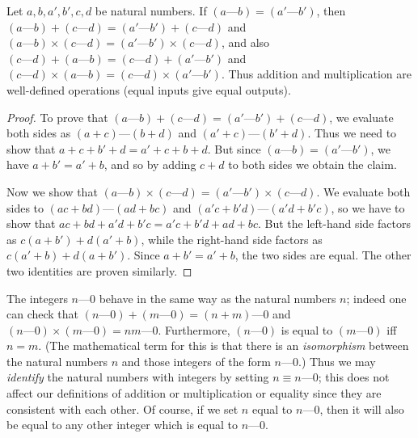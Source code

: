 \begin{lem}\label{4.1.3}
  Let \(a, b, a', b', c, d\) be natural numbers.
  If \((a \text{---} b) = (a' \text{---} b')\), then \((a \text{---} b) + (c \text{---} d) = (a' \text{---} b') + (c \text{---} d)\) and \((a \text{---} b) \times (c \text{---} d) = (a' \text{---} b') \times (c \text{---} d)\), and also \((c \text{---} d) + (a \text{---} b) = (c \text{---} d) + (a' \text{---} b')\) and \((c \text{---} d) \times (a \text{---} b) = (c \text{---} d) \times (a' \text{---} b')\).
  Thus addition and multiplication are well-defined operations (equal inputs give equal outputs).
\end{lem}

\begin{proof}
  To prove that \((a \text{---} b) + (c \text{---} d) = (a' \text{---} b') + (c \text{---} d)\), we evaluate both sides as \((a + c) \text{---} (b + d)\) and \((a' + c) \text{---} (b' + d)\).
  Thus we need to show that \(a + c + b' + d = a' + c + b + d\).
  But since \((a \text{---} b) = (a' \text{---} b')\), we have \(a + b' = a' + b\), and so by adding \(c + d\) to both sides we obtain the claim.

  Now we show that \((a \text{---} b) \times (c \text{---} d) = (a' \text{---} b') \times (c \text{---} d)\).
  We evaluate both sides to \((ac + bd) \text{---} (ad + bc)\) and \((a'c + b'd) \text{---} (a'd + b'c)\), so we have to show that \(ac + bd + a'd + b'c = a'c + b'd + ad + bc\).
  But the left-hand side factors as \(c(a + b') + d(a' + b)\), while the right-hand side factors as \(c(a' + b) + d(a + b')\).
  Since \(a + b' = a' + b\), the two sides are equal.
  The other two identities are proven similarly.
\end{proof}

\begin{note}
  The integers \(n \text{---} 0\) behave in the same way as the natural numbers \(n\);
  indeed one can check that \((n \text{---} 0) + (m \text{---} 0) = (n + m) \text{---} 0\) and \((n \text{---} 0) \times (m \text{---} 0) = nm \text{---} 0\).
  Furthermore, \((n \text{---} 0)\) is equal to \((m \text{---} 0)\) iff \(n = m\).
  (The mathematical term for this is that there is an \emph{isomorphism} between the natural numbers \(n\) and those integers of the form \(n \text{---} 0\).)
  Thus we may \emph{identify} the natural numbers with integers by setting \(n \equiv n \text{---} 0\);
  this does not affect our definitions of addition or multiplication or equality since they are consistent with each other.
  Of course, if we set \(n\) equal to \(n \text{---} 0\), then it will also be equal to any other integer which is equal to \(n \text{---} 0\).
\end{note}

